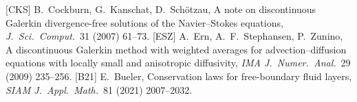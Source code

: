 \documentclass[10pt]{article}
\begin{document}
{\small
[CKS] B.\ Cockburn, G.\ Kanschat, D.\ Sch\"otzau, A note on discontinuous Galerkin divergence-free solutions of the Navier--Stokes equations, \emph{J.\ Sci.\ Comput.}\ 31 (2007) 61--73.
[ESZ] A.\ Ern, A.\ F.\ Stephansen, P.\ Zunino, A discontinuous Galerkin method with weighted averages for advection--diffusion equations with locally small and anisotropic diffusivity, \emph{IMA J.\ Numer.\ Anal.}\ 29 (2009) 235--256.
[B21] E.\ Bueler, Conservation laws for free-boundary fluid layers, \emph{SIAM J.\ Appl.\ Math.}\ 81 (2021) 2007--2032.
}
\end{document}
